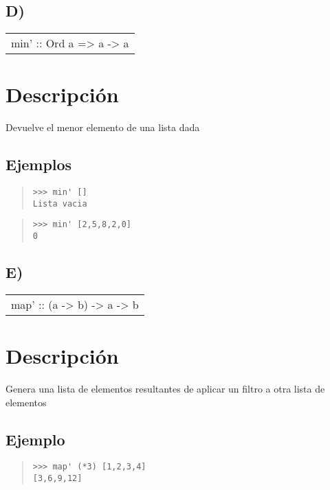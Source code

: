 \subsection{D)}
\begin{haddockdesc}
\item[\begin{tabular}{@{}l}
min' :: Ord a => {\char 91}a{\char 93} -> a
\end{tabular}]
{\haddockbegindoc
\section*{Descripción}
Devuelve el menor elemento de una lista dada\par
\subsection*{Ejemplos}
\begin{quote}
{\haddockverb\begin{verbatim}
>>> min' []
Lista vacia

\end{verbatim}}
\end{quote}
\begin{quote}
{\haddockverb\begin{verbatim}
>>> min' [2,5,8,2,0]
0

\end{verbatim}}
\end{quote}}
\end{haddockdesc}
\subsection{E)}
\begin{haddockdesc}
\item[\begin{tabular}{@{}l}
map' :: (a -> b) -> {\char 91}a{\char 93} -> {\char 91}b{\char 93}
\end{tabular}]
{\haddockbegindoc
\section*{Descripción}
Genera una lista de elementos resultantes de aplicar un filtro a otra lista de elementos\par
\subsection*{Ejemplo}
\begin{quote}
{\haddockverb\begin{verbatim}
>>> map' (*3) [1,2,3,4]
[3,6,9,12]

\end{verbatim}}
\end{quote}}
\end{haddockdesc}
